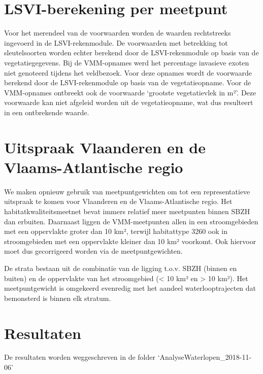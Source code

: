 \documentclass[twoside]{extreport}
\begin{document}
\section{LSVI-berekening per
meetpunt}\label{lsvi-berekening-per-meetpunt-5}

Voor het merendeel van de voorwaarden worden de waarden rechtstreeks
ingevoerd in de LSVI-rekenmodule. De voorwaarden met betrekking tot
sleutelsoorten worden echter berekend door de LSVI-rekenmodule op basis
van de vegetatiegegevens. Bij de VMM-opnames werd het percentage
invasieve exoten niet genoteerd tijdens het veldbezoek. Voor deze
opnames wordt de voorwaarde berekend door de LSVI-rekenmodule op basis
van de vegetatieopname. Voor de VMM-opnames ontbreekt ook de voorwaarde
`grootste vegetatievlek in m²'. Deze voorwaarde kan niet afgeleid worden
uit de vegetatieopname, wat dus resulteert in een ontbrekende waarde.

\section{Uitspraak Vlaanderen en de Vlaams-Atlantische
regio}\label{uitspraak-vlaanderen-en-de-vlaams-atlantische-regio-6}

We maken opnieuw gebruik van meetpuntgewichten om tot een
representatieve uitspraak te komen voor Vlaanderen en de
Vlaams-Atlantische regio. Het habitatkwaliteitsmeetnet bevat immers
relatief meer meetpunten binnen SBZH dan erbuiten. Daarnaast liggen de
VMM-meetpunten allen in een stroomgebieden met een oppervlakte groter
dan 10 km², terwijl habitattype 3260 ook in stroomgebieden met een
oppervlakte kleiner dan 10 km² voorkomt. Ook hiervoor moet dus
gecorrigeerd worden via de meetpuntgewichten.

De strata bestaan uit de combinatie van de ligging t.o.v. SBZH (binnen
en buiten) en de oppervlakte van het stroomgebied (\textless{} 10 km² en
\textgreater{} 10 km²). Het meetpuntgewicht is omgekeerd evenredig met
het aandeel waterlooptrajecten dat bemonsterd is binnen elk stratum.

\section{Resultaten}\label{resultaten-6}

De resultaten worden weggeschreven in de folder
`AnalyseWaterlopen\_2018-11-06'

\cleardoublepage


\appendix
\end{document}
